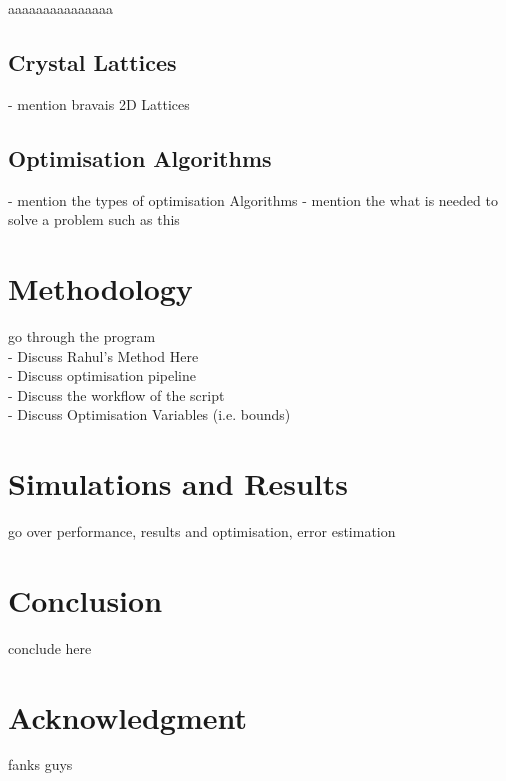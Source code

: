 \documentclass[conference]{IEEEtran}
\begin{document}
aaaaaaaaaaaaaaa

\subsection{Crystal Lattices}

- mention bravais 2D Lattices

\subsection{Optimisation Algorithms}

- mention the types of optimisation Algorithms
- mention the what is needed to solve a problem such as this


\section{Methodology}

go through the program\\
- Discuss Rahul's Method Here\\
- Discuss optimisation pipeline\\
- Discuss the workflow of the script \\
- Discuss Optimisation Variables (i.e. bounds)\\

\section{Simulations and Results}

go over performance, results and optimisation, error estimation

\section{Conclusion}

conclude here

\section*{Acknowledgment}

fanks guys
\end{document}
